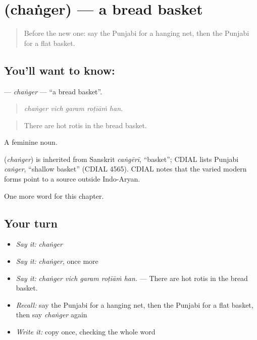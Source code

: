 \section[\texorpdfstring{\pa{ਚੰਗੇਰ} (chaṅger)}{ਚੰਗੇਰ (chaṅger)}]{ (chaṅger) — a bread basket}

\label{lesson:PA-C251-changer}



\begin{quote}
Before the new one: say the Punjabi for a hanging net, then the Punjabi for a flat basket.
\end{quote}

\subsection*{You'll want to know: }
\textbf{} — \emph{chaṅger} — \textquotedblleft{}a bread basket\textquotedblright{}.

\begin{quote}
    
\end{quote}

\begin{quote}
\emph{chaṅger vich garam roṭīāṁ han.}
\end{quote}

\begin{quote}
There are hot rotis in the bread basket.
\end{quote}

A feminine noun.

\begin{cousinweb}
\textbf{} (\emph{chaṅger}) is inherited from Sanskrit \emph{caṅgērī}, \textquotedblleft{}basket\textquotedblright{}; CDIAL lists Punjabi \emph{caṅger}, \textquotedblleft{}shallow basket\textquotedblright{} (CDIAL 4565). CDIAL notes that the varied modern forms point to a source outside Indo-Aryan.
\end{cousinweb}

\begin{grammarlens}[title={What you've built}]
One more word for this chapter.
\end{grammarlens}

\subsection*{Your turn}
\begin{itemize}
\raggedright
  \item \emph{Say it:} \emph{chaṅger}
  \item \emph{Say it:} \emph{chaṅger}, once more
  \item \emph{Say it:} \emph{chaṅger vich garam roṭīāṁ han.} — There are hot rotis in the bread basket.
  \item \emph{Recall:} say the Punjabi for a hanging net, then the Punjabi for a flat basket, then say \emph{chaṅger} again
  \item \emph{Write it:} copy \textbf{} once, checking the whole word
\end{itemize}

